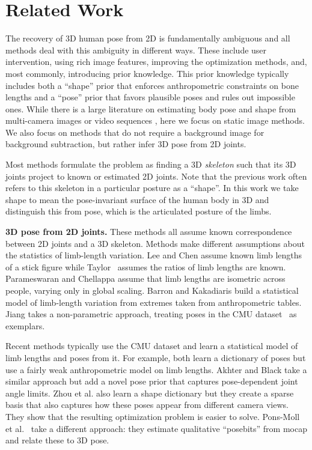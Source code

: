 \documentclass[runningheads]{llncs}
\begin{document}
\section{Related Work}
\label{sec:related}
The recovery of 3D human pose from 2D is fundamentally ambiguous and all methods deal with this ambiguity in different ways.
These include user intervention, using rich image features, improving the optimization methods, and, most commonly, introducing prior knowledge.
This prior knowledge typically includes both a ``shape'' prior that
enforces anthropometric constraints on bone lengths and a ``pose''
prior that favors plausible poses and rules out impossible ones. 
While there is a large literature on estimating body pose and shape
from multi-camera images or
video sequences \cite{Balan:2007,Grest:2005,Jain:2010,Sminchisescu:2002}, here we focus on static image methods.
We also focus on methods that do not require a background image for
background subtraction, but rather infer 3D pose from 2D joints.

Most methods formulate the problem as finding a 3D {\em skeleton} such that its 3D joints project to known or estimated 2D joints.
Note that the previous work often refers to this skeleton in a
particular posture as a ``shape''.
In this work we take shape to mean the pose-invariant surface of the
human body in 3D and distinguish this from pose, which is the articulated posture of the limbs.

{\bf 3D pose from 2D joints.} 
These methods all assume known correspondence between 2D joints and a 3D skeleton. 
Methods make different assumptions about the statistics of limb-length variation. Lee and Chen \cite{Lee1985} assume known limb lengths of a stick figure  while
Taylor~\cite{Taylor:2000} assumes the ratios of limb lengths are known.
Parameswaran and Chellappa  \cite{Parameswaran:CVPR:2004} assume that
limb lengths are isometric across people, varying only in global scaling.
Barron and Kakadiaris \cite{BarronKakadiaris2001} build a statistical
model of limb-length variation from extremes taken from anthropometric tables.
Jiang \cite{Jiang} takes a non-parametric approach, treating poses in the CMU dataset~\cite{cmu} as exemplars.

Recent methods typically use the CMU dataset and learn a statistical model of limb lengths and poses from it.
For example,  both \cite{Fan:2014,Ramakrishna:2012} learn a dictionary of poses but use a fairly weak anthropometric model on limb lengths.
Akhter and Black \cite{Akhter:2015} take a similar approach but add a novel pose prior that captures pose-dependent joint angle limits.
Zhou et al. \cite{Zhou:2015b} also learn a shape dictionary but
they create a sparse basis that also captures how these poses appear from different camera views.  They show that the resulting
optimization problem is easier to solve. 
Pons-Moll et al.~\cite{Pons:2014} take a different approach:
they estimate qualitative ``posebits'' from mocap and relate these to 3D pose.
\end{document}
